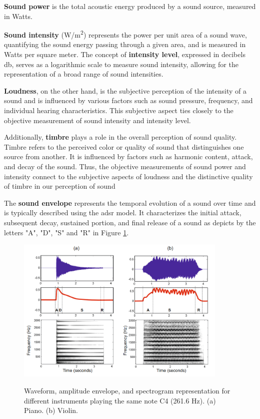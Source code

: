 \textbf{Sound power} is the total acoustic energy produced by a sound source, measured in Watts.

\textbf{Sound intensity} (W/m\textsuperscript{2}) represents the power per unit area of a sound wave, quantifying the sound energy passing through a given area, and is measured in Watts per square meter. The concept of \textbf{intensity level}, expressed in decibels \gls{db}, serves as a logarithmic scale to measure sound intensity, allowing for the representation of a broad range of sound intensities.

\textbf{Loudness}, on the other hand, is the subjective perception of the intensity of a sound and is influenced by various factors such as sound pressure, frequency, and individual hearing characteristics. This subjective aspect ties closely to the objective measurement of sound intensity and intensity level.

Additionally, \textbf{timbre} plays a role in the overall perception of sound quality. Timbre refers to the perceived color or quality of sound that distinguishes one source from another. It is influenced by factors such as harmonic content, attack, and decay of the sound. Thus, the objective measurements of sound power and intensity connect to the subjective aspects of loudness and the distinctive quality of timbre in our perception of sound

The \textbf{sound envelope} represents the temporal evolution of a sound over time and is typically described using the \gls{adsr} model. It characterizes the initial attack, subsequent decay, sustained portion, and final release of a sound as depicts by the letters "A", "D", "S" and "R" in Figure \ref{fig:frmwk_audio_fund_adsr}.

\begin{figure}[htbp]
    \raggedright
        \caption{Waveform, amplitude envelope, and spectrogram representation for different instruments playing the same note C4 (261.6 Hz). (a) Piano. (b) Violin.}
        \includegraphics[width=0.9\textwidth]{resources/images/030-theoretical_framework/Framework_audio_fund_ADSR.png}
        \label{fig:frmwk_audio_fund_adsr}
\end{figure}

